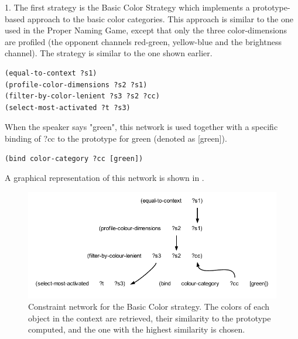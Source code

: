 1. The first strategy is the {\bfshape Basic Color Strategy} which implements a prototype-based approach to 
the basic color categories. This approach is similar to the one used in the Proper Naming Game, except that 
only the three color-dimensions are profiled (the opponent channels red-green, yellow-blue and the brightness channel). 
The strategy is similar to the one shown earlier. 
\begin{verbatim}
(equal-to-context ?s1) 
(profile-color-dimensions ?s2 ?s1)
(filter-by-color-lenient ?s3 ?s2 ?cc)
(select-most-activated ?t ?s3)
\end{verbatim}
When the speaker says "green", this network is used together with a specific binding of ?cc to the prototype for 
green (denoted as [green]). 
\begin{verbatim}
(bind color-category ?cc [green])
\end{verbatim}
A graphical representation of this network is shown in . 

\begin{figure}[htbp]
  \centerline{\includegraphics[width=1.0\textwidth]{chap11/figs/basic-strat}}
\caption{\label{fig:basic-strat} 
Constraint network for the Basic Color strategy. The colors of each object in the context are retrieved, their 
similarity to the prototype computed, and the one with the highest similarity is chosen.}
\end{figure}

